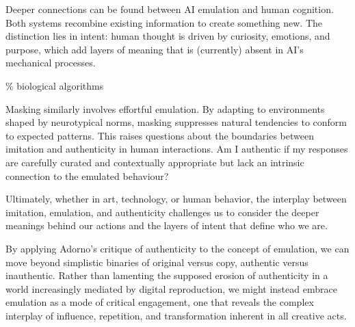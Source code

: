 Deeper connections can be found between AI emulation and human cognition. Both systems recombine existing information to create something new. The distinction lies in intent: human thought is driven by curiosity, emotions, and purpose, which add layers of meaning that is (currently) absent in AI's mechanical processes.

{\scriptsize \textcolor{comment}{\%  biological algorithms}}

Masking similarly involves effortful emulation. By adapting to environments shaped by neurotypical norms, masking suppresses natural tendencies to conform to expected patterns. This raises questions about the boundaries between imitation and authenticity in human interactions. Am I authentic if my responses are carefully curated and contextually appropriate but lack an intrinsic connection to the emulated behaviour?

Ultimately, whether in art, technology, or human behavior, the interplay between imitation, emulation, and authenticity challenges us to consider the deeper meanings behind our actions and the layers of intent that define who we are.

By applying Adorno's critique of authenticity to the concept of emulation, we can move beyond simplistic binaries of original versus copy, authentic versus inauthentic. Rather than lamenting the supposed erosion of authenticity in a world increasingly mediated by digital reproduction, we might instead embrace emulation as a mode of critical engagement, one that reveals the complex interplay of influence, repetition, and transformation inherent in all creative acts.